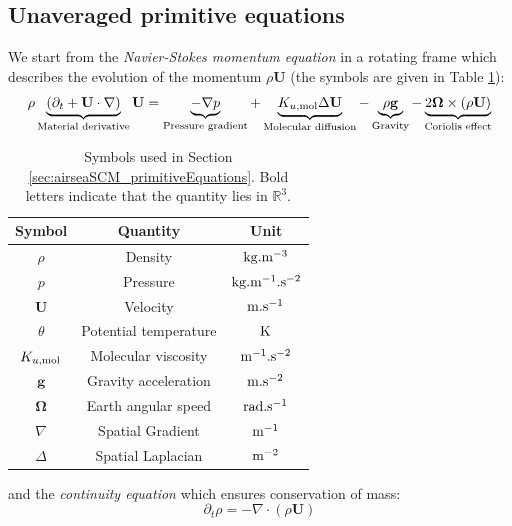 \subsection{Unaveraged primitive equations}
\label{sec:airseaSCM_nonTurbulentPrimitiveEq}
We start from the \textit{Navier-Stokes momentum equation}
in a rotating frame
which describes the evolution of the momentum $\rho \mathbf{U}$
(the symbols are given in Table
\ref{tab:airseaSCM_primitiveEquationsSymbols}):
\begin{equation}
\label{eq:airseaSCM_momentumNavierStokes}
\rho \underbrace{
\left(\partial_t + \mathbf{U} \cdot \nabla \right)
	}_{\text{Material derivative}} \mathbf{U}
=
\underbrace{
	- \nabla p
}_{\text{Pressure gradient}}
+
\underbrace{
	K_{u, {\rm mol}} \Delta \mathbf{U}
}_{\text{Molecular diffusion}}
-
\underbrace{
	\rho \mathbf{g}
}_{\text{Gravity}}
-
\underbrace{
2 \mathbf{\Omega} \times (\rho \mathbf{U})
}_{\text{Coriolis effect}}
\end{equation}
\begin{table}
\centering
\begin{tabular}{c|c|c}
Symbol & Quantity & Unit \\
\hline
$\rho$& {Density} & ${\rm kg}.{\rm m}^{-3}$ \\
$p$   & {Pressure} & ${\rm kg}.{\rm m}^{-1}.{\rm s}^{-2}$ \\
$\mathbf{U}$ & {Velocity}& ${\rm m}.{\rm s}^{-1}$ \\
$\theta$ & {Potential temperature}& ${\rm K}$ \\
$K_{u, {\rm mol}}$ & {Molecular viscosity}& ${\rm m}^{-1}.{\rm s}^{-2}$ \\
$\mathbf{g}$ & {Gravity acceleration}& ${\rm m}.{\rm s}^{-2}$ \\
$\mathbf{\Omega}$ & {Earth angular speed}& ${\rm rad}.{\rm s}^{-1}$ \\
$\nabla$ & {Spatial Gradient} & ${\rm m}^{-1}$\\
$\Delta$ & {Spatial Laplacian} &${\rm m}^{-2}$
\end{tabular}
\caption{Symbols used in Section
\ref{sec:airseaSCM_primitiveEquations}. Bold letters
indicate that the quantity lies in $\mathbb{R}^3$.}
\label{tab:airseaSCM_primitiveEquationsSymbols}
\end{table}
and the \textit{continuity equation} which ensures
conservation of mass:
\begin{equation}
\label{eq:airseaSCM_conservationMass}
\partial_t \rho = - \nabla \cdot (\rho \mathbf{U})
\end{equation}
